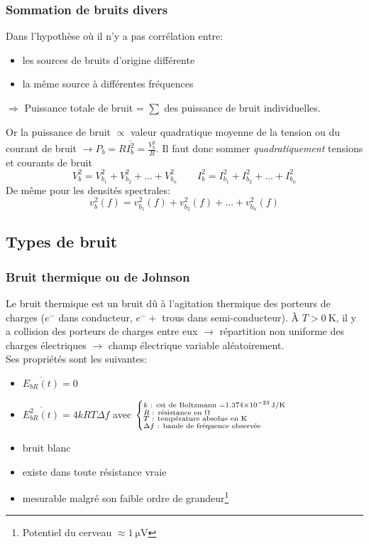 \subsubsection{Sommation de bruits divers}
Dans l'hypothèse où il n'y a pas corrélation entre:
\begin{itemize}
	\item les sources de bruits d'origine différente
	\item la même source à différentes fréquences
\end{itemize}
\centerline{\(\Rightarrow\) Puissance totale de bruit = \(\sum\) des puissance de bruit individuelles.}
Or la puissance de bruit \(\propto\) valeur quadratique moyenne de la tension ou du courant de bruit \(\rightarrow P_b=R \overline{I^2_b} = \frac{\overline{V_b^2}}{R}\). Il faut donc sommer \emph{quadratiquement} tensions et courants de bruit 
\[
V_b^2 = V_{b_1}^2 + V_{b_2}^2 + \dots + V_{b_n}^2 \qquad I_b^2 = I_{b_1}^2 + I_{b_2}^2 + \dots + I_{b_n}^2
\]
De même pour les densités spectrales:
\[
v_b^2(f) = v_{b_1}^2(f) + v_{b_2}^2(f) + \dots + v_{b_n}^2(f)
\]
\subsection{Types de bruit}
\subsubsection{Bruit thermique ou de Johnson}
Le bruit thermique est un bruit dû à l'agitation thermique des porteurs de charges (\(e^-\) dans conducteur, \(e^-+\) trous dans semi-conducteur). À \(T>\SI{0}{\kelvin}\), il y a collision des porteurs de charges entre eux \(\rightarrow\) répartition non uniforme des charges électriques \(\rightarrow\) champ électrique variable aléatoirement.\\

Ses propriétés sont les suivantes:
\begin{itemize}
	\item { \(\overline{E_{bR}(t)}=0\)} 
	\item { \(\overline{E^2_{bR}(t)}=4kRT\Delta f\)} avec \(\left\{\substack{k\text{ : cst de Boltzmann }=\SI[per-mode=symbol]{1.374e-23}{\joule\per\kelvin}\\
	R \text{ : résistance en }\si{\ohm}\hfill \\
	T\text{ : température absolue en }\si{\kelvin}\hfill\\
	\Delta f\text{ : bande de fréquence observée}\hfill}\right.\)
	\item bruit blanc
	\item existe dans toute résistance vraie
	\item mesurable malgré son faible ordre de grandeur\footnote{Potentiel du cerveau \(\approx \SI{1}{\micro\volt}\)}
\end{itemize}
